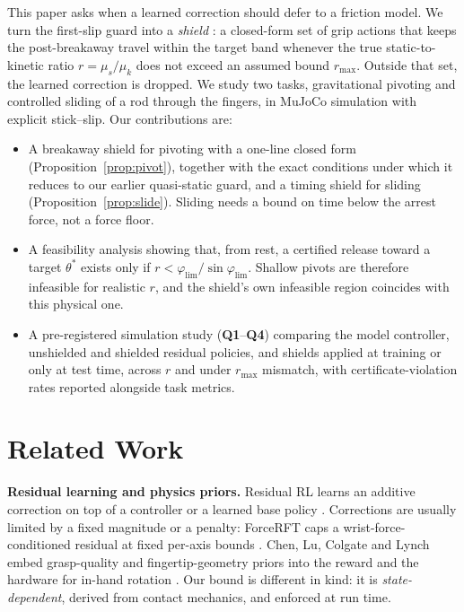 \documentclass[10pt,twocolumn,letterpaper]{article}
\newcommand{\Q}[1]{\textbf{Q#1}}
\begin{document}
This paper asks when a learned correction should defer to a friction model. We turn the first-slip guard into a \emph{shield} \cite{alshiekh2018}: a closed-form set of grip actions that keeps the post-breakaway travel within the target band whenever the true static-to-kinetic ratio $r=\mu_s/\mu_k$ does not exceed an assumed bound $r_{\max}$. Outside that set, the learned correction is dropped. We study two tasks, gravitational pivoting and controlled sliding of a rod through the fingers, in MuJoCo simulation with explicit stick--slip. Our contributions are:
\begin{itemize}\setlength\itemsep{1pt}
\item A breakaway shield for pivoting with a one-line closed form (Proposition~\ref{prop:pivot}), together with the exact conditions under which it reduces to our earlier quasi-static guard, and a timing shield for sliding (Proposition~\ref{prop:slide}). Sliding needs a bound on time below the arrest force, not a force floor.
\item A feasibility analysis showing that, from rest, a certified release toward a target $\theta^\ast$ exists only if $r<\varphi_{\lim}/\sin\varphi_{\lim}$. Shallow pivots are therefore infeasible for realistic $r$, and the shield's own infeasible region coincides with this physical one.
\item A pre-registered simulation study (\Q1--\Q4) comparing the model controller, unshielded and shielded residual policies, and shields applied at training or only at test time, across $r$ and under $r_{\max}$ mismatch, with certificate-violation rates reported alongside task metrics.
\end{itemize}

\section{Related Work}
\textbf{Residual learning and physics priors.} Residual RL learns an additive correction on top of a controller \cite{johannink2019,silver2018} or a learned base policy \cite{ankile2024}. Corrections are usually limited by a fixed magnitude or a penalty: ForceRFT caps a wrist-force-conditioned residual at fixed per-axis bounds \cite{forcerft2026}. Chen, Lu, Colgate and Lynch embed grasp-quality and fingertip-geometry priors into the reward and the hardware for in-hand rotation \cite{chen2026priors}. Our bound is different in kind: it is \emph{state-dependent}, derived from contact mechanics, and enforced at run time.
\end{document}
